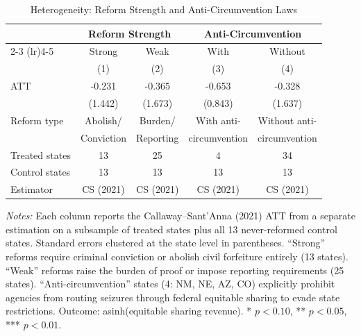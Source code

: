 \begin{table}[H]
\centering
\caption{Heterogeneity: Reform Strength and Anti-Circumvention Laws}
\label{tab:hetero}
\begin{threeparttable}
\begin{tabular}{lcccc}
\toprule
 & \multicolumn{2}{c}{Reform Strength} & \multicolumn{2}{c}{Anti-Circumvention} \\
\cmidrule(lr){2-3} \cmidrule(lr){4-5}
 & Strong & Weak & With & Without \\
 & (1) & (2) & (3) & (4) \\
\midrule
ATT & -0.231 & -0.365 & -0.653 & -0.328 \\
 & (1.442) & (1.673) & (0.843) & (1.637) \\
\midrule
Reform type & Abolish/ & Burden/ & With anti- & Without anti- \\
 & Conviction & Reporting & circumvention & circumvention \\
Treated states & 13 & 25 & 4 & 34 \\
Control states & 13 & 13 & 13 & 13 \\
Estimator & CS (2021) & CS (2021) & CS (2021) & CS (2021) \\
\bottomrule
\end{tabular}
\begin{tablenotes}[flushleft]
\small
\item \textit{Notes:} Each column reports the Callaway--Sant'Anna (2021) ATT from a separate estimation on a subsample of treated states plus all 13 never-reformed control states. Standard errors clustered at the state level in parentheses. ``Strong'' reforms require criminal conviction or abolish civil forfeiture entirely (13 states). ``Weak'' reforms raise the burden of proof or impose reporting requirements (25 states). ``Anti-circumvention'' states (4: NM, NE, AZ, CO) explicitly prohibit agencies from routing seizures through federal equitable sharing to evade state restrictions. Outcome: asinh(equitable sharing revenue). * $p<0.10$, ** $p<0.05$, *** $p<0.01$.
\end{tablenotes}
\end{threeparttable}
\end{table}
